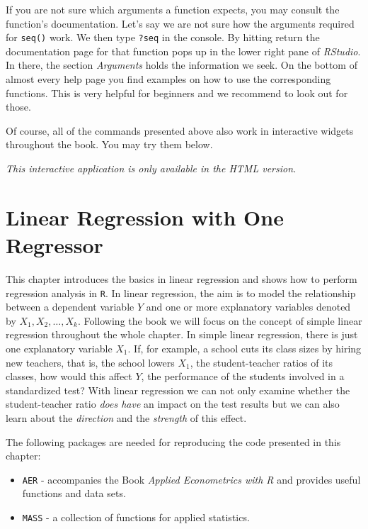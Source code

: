 \documentclass[]{book}
\theoremstyle{definition}
\theoremstyle{definition}
\theoremstyle{definition}
\theoremstyle{remark}
\begin{document}
If you are not sure which arguments a function expects, you may consult
the function's documentation. Let's say we are not sure how the
arguments required for \texttt{seq()} work. We then type \texttt{?seq}
in the console. By hitting return the documentation page for that
function pops up in the lower right pane of \emph{RStudio}. In there,
the section \emph{Arguments} holds the information we seek. On the
bottom of almost every help page you find examples on how to use the
corresponding functions. This is very helpful for beginners and we
recommend to look out for those.

Of course, all of the commands presented above also work in interactive
widgets throughout the book. You may try them below.

\begin{center}\textit{This interactive application is only available in the HTML version.}\end{center}

\chapter{Linear Regression with One Regressor}\label{lrwor}

This chapter introduces the basics in linear regression and shows how to
perform regression analysis in \texttt{R}. In linear regression, the aim
is to model the relationship between a dependent variable \(Y\) and one
or more explanatory variables denoted by \(X_1, X_2, \dots, X_k\).
Following the book we will focus on the concept of simple linear
regression throughout the whole chapter. In simple linear regression,
there is just one explanatory variable \(X_1\). If, for example, a
school cuts its class sizes by hiring new teachers, that is, the school
lowers \(X_1\), the student-teacher ratios of its classes, how would
this affect \(Y\), the performance of the students involved in a
standardized test? With linear regression we can not only examine
whether the student-teacher ratio \emph{does have} an impact on the test
results but we can also learn about the \emph{direction} and the
\emph{strength} of this effect.

The following packages are needed for reproducing the code presented in
this chapter:

\begin{itemize}
\item
  \texttt{AER} - accompanies the Book \emph{Applied Econometrics with R}
  \citet{kleiber2008} and provides useful functions and data sets.
\item
  \texttt{MASS} - a collection of functions for applied statistics.
\end{itemize}
\end{document}
